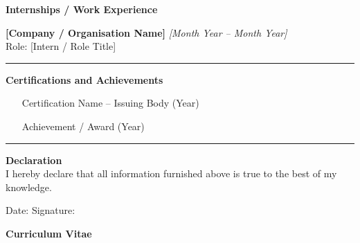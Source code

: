 \noindent\textbf{Internships / Work Experience}
\vspace{0.2cm}

\noindent\textbf{[Company / Organisation Name]} \hfill \textit{[Month Year -- Month Year]}\\
Role: [Intern / Role Title]\\
[Brief description of work done.]

\vspace{0.4cm}\hrule\vspace{0.4cm}

\noindent\textbf{Certifications and Achievements}
\begin{itemize}\setlength\itemsep{1pt}
  \item [Certification Name -- Issuing Body (Year)]
  \item [Achievement / Award (Year)]
\end{itemize}

\vspace{0.4cm}\hrule\vspace{0.4cm}

\noindent\textbf{Declaration}\\[3pt]
I hereby declare that all information furnished above is true to the best of
my knowledge.

\vspace{0.6cm}
\noindent Date: \submissiondate \hfill Signature: \underline{\hspace{4cm}}

\newpage
\thispagestyle{fancy}

\begin{center}
  {\Large\textbf{Curriculum Vitae}}
\end{center}

\vspace{0.3cm}

